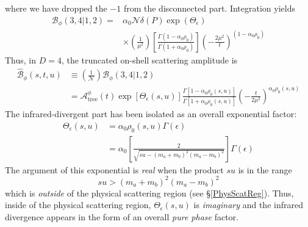 where we have dropped the ${-1}$ from the disconnected part. Integration yields
\begin{equation}
\begin{split}
	\mathcal{B}_{\phi}(3, 4|1,2) = {}& \alpha_{0} \mathcal{N} \delta(P) \exp{(\Theta_{\epsilon})} \\
	&\times \left( \frac{1}{\mu^{2}} \right) \left[ \frac{\Gamma(1 - \alpha_{0} \rho_{0})}{\Gamma(1 + \alpha_{0} \rho_{0})} \right] \left( -\frac{2 \mu^{2}}{t} \right)^{(1 - \alpha_{0} \rho_{0})}
\end{split}
\end{equation}
Thus, in $D = 4$, the truncated on-shell scattering amplitude is
\begin{align}
	\widehat{\mathcal{B}}_{\phi}(s, t, u) &\equiv \left( \frac{1}{\mathcal{N}} \right) \mathcal{B}_{\phi}(3, 4|1,2) \nonumber \\
	&= \mathcal{A}_{\text{tree}}^{\phi}(t) \exp{[ \Theta_{\epsilon}(s, u)]} \frac{\Gamma[1 - \alpha_{0} \rho_{0}(s, u)]}{\Gamma[1 + \alpha_{0} \rho_{0}(s, u)]} \left( -\frac{t}{2 \mu^{2}} \right)^{\alpha_{0} \rho_{0}(s, u)} \label{BoundAmp}
\end{align}
The infrared-divergent part has been isolated as an overall exponential factor:
\begin{align}
	\Theta_{\epsilon}(s, u) &= \alpha_{0} \rho_{0}(s, u) \Gamma(\epsilon) \nonumber \\
	&= \alpha_{0} \left[ \frac{2}{\sqrt{s u - (m_{a} + m_{b})^{2} (m_{a} - m_{b})^{2}}} \right] \Gamma(\epsilon)
\end{align}
The argument of this exponential is \textit{real} when the product $s u$ is in the range
\begin{equation}
	 s u > (m_{a} + m_{b})^{2} (m_{a} - m_{b})^{2}
\end{equation}
which is \textit{outside} of the physical scattering region (see \S\ref{PhysScatReg}). Thus, inside of the physical scattering region, $\Theta_{\epsilon}(s, u)$ is \textit{imaginary} and the infrared divergence appears in the form of an overall \textit{pure phase} factor.
